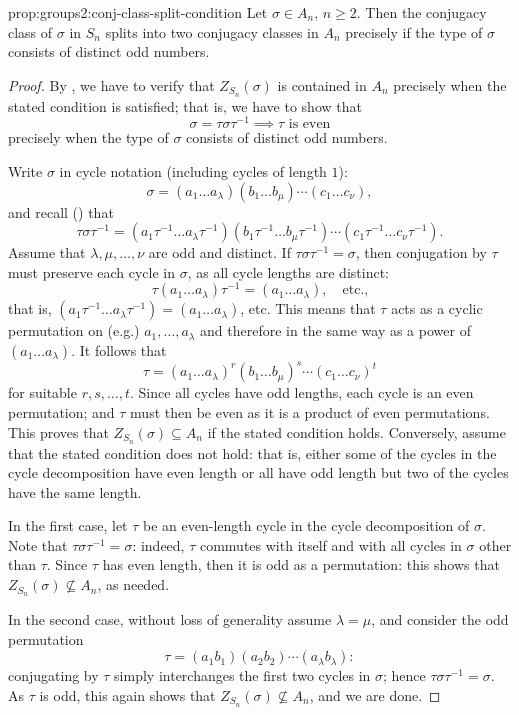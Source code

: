 \begin{prop}{}{prop:groups2:conj-class-split-condition}
  Let $\sigma \in A_n$, $n \geq 2$. Then the conjugacy class of
  $\sigma$ in $S_n$ splits into two conjugacy classes in $A_n$
  precisely if the type of $\sigma$ consists of distinct odd numbers.
\end{prop}
\begin{proof}
  By , we have to verify that
  $Z_{S_n}(\sigma)$ is contained in $A_n$ precisely when the stated
  condition is satisfied; that is, we have to show that
  \[
    \sigma = \tau\sigma\tau^{-1} \implies \tau \text{ is even}
  \]
  precisely when the type of $\sigma$ consists of distinct odd
  numbers.

  Write $\sigma$ in cycle notation (including cycles of length $1$):
  \[
    \sigma = (a_1 \dots a_\lambda)(b_1 \dots b_\mu)\cdots(c_1 \dots
    c_\nu),
  \]
  and recall () that
  \[
    \tau\sigma\tau^{-1} = (a_1\tau^{-1}\dots a_\lambda\tau^{-1})
    (b_1\tau^{-1}\dots b_\mu\tau^{-1})\cdots(c_1\tau^{-1}\dots
    c_\nu\tau^{-1}).
  \]
  Assume that $\lambda, \mu, \dots, \nu$ are odd and distinct. If
  $\tau\sigma\tau^{-1} = \sigma$, then conjugation by $\tau$ must
  preserve each cycle in $\sigma$, as all cycle lengths are distinct:
  \[
    \tau(a_1 \dots a_\lambda)\tau^{-1} = (a_1 \dots a_\lambda), \quad
    \text{etc.,}
  \]
  that is,
  $(a_1\tau^{-1}\dots a_\lambda\tau^{-1}) = (a_1 \dots a_\lambda)$,
  etc. This means that $\tau$ acts as a cyclic permutation on (e.g.)
  $a_1,\dots,a_\lambda$ and therefore in the same way as a power of
  $(a_1 \dots a_\lambda)$. It follows that
  \[
    \tau = (a_1 \dots a_\lambda)^r(b_1 \dots b_\mu)^s\cdots(c_1 \dots
    c_\nu)^t
  \]
  for suitable $r, s, \dots, t$. Since all cycles have odd lengths,
  each cycle is an even permutation; and $\tau$ must then be even as
  it is a product of even permutations. This proves that
  $Z_{S_n}(\sigma) \subseteq A_n$ if the stated condition holds.
  Conversely, assume that the stated condition does not hold: that is,
  either some of the cycles in the cycle decomposition have even
  length or all have odd length but two of the cycles have the same
  length.

  In the first case, let $\tau$ be an even-length cycle in the cycle
  decomposition of $\sigma$. Note that $\tau\sigma\tau^{-1} = \sigma$:
  indeed, $\tau$ commutes with itself and with all cycles in $\sigma$
  other than $\tau$.  Since $\tau$ has even length, then it is odd as
  a permutation: this shows that $Z_{S_n}(\sigma) \not\subseteq A_n$,
  as needed.

  In the second case, without loss of generality assume
  $\lambda = \mu$, and consider the odd permutation
  \[
    \tau = (a_1 b_1)(a_2 b_2)\cdots(a_\lambda b_\lambda):
  \]
  conjugating by $\tau$ simply interchanges the first two cycles in
  $\sigma$; hence $\tau\sigma\tau^{-1} = \sigma$. As $\tau$ is odd,
  this again shows that $Z_{S_n}(\sigma) \not\subseteq A_n$, and we
  are done.
\end{proof}
